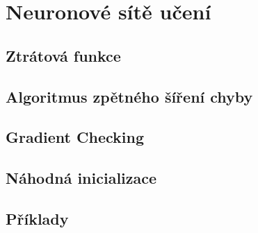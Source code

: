 
\chapter{Neuronové sítě učení}

\section{Ztrátová funkce}
\section{Algoritmus zpětného šíření chyby}
\section{Gradient Checking}
\section{Náhodná inicializace}
\section{Příklady}
